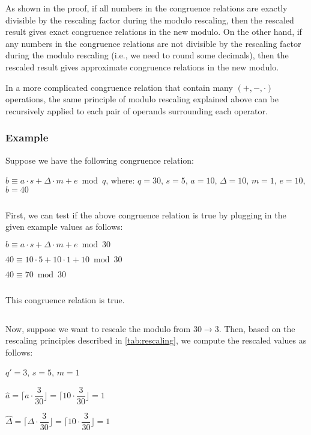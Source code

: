 As shown in the proof, if all numbers in the congruence relations are exactly divisible by the rescaling factor during the modulo rescaling, then the rescaled result gives exact congruence relations in the new modulo. On the other hand, if any numbers in the congruence relations are not divisible by the rescaling factor during the modulo rescaling (i.e., we need to round some decimals), then the rescaled result gives approximate congruence relations in the new modulo.

In a more complicated congruence relation that contain many $(+, -, \cdot)$ operations, the same principle of modulo rescaling explained above can be recursively applied to each pair of operands surrounding each operator. 

\subsubsection{Example}
\label{subsec:modulo-rescaling-ex}

Suppose we have the following congruence relation:

$b \equiv a\cdot s + \Delta \cdot m + e \bmod q$, \text{ } where: $q = 30$, \text{ } $s = 5$, \text{ } $a = 10$, \text{ } $\Delta = 10$, \text{ } $m = 1$, \text{ } $e = 10$, \text{ } $b = 40$

$ $

First, we can test if the above congruence relation is true by plugging in the given example values as follows: 

$b \equiv a\cdot s + \Delta \cdot m + e \bmod 30$

$40 \equiv 10 \cdot 5 + 10 \cdot 1 + 10 \bmod 30$

$40 \equiv 70 \bmod 30$ 

$ $

This congruence relation is true. 

$ $

Now, suppose we want to rescale the modulo from $30 \rightarrow 3$. Then, based on the rescaling principles described in \autoref{tab:rescaling}, we compute the rescaled values as follows: 

$q'= 3$, \text{ } $s = 5$, \text{ } $m = 1$

$\hat{a} = \Bigg\lceil a\cdot\dfrac{3}{30} \Bigg\rfloor = \Bigg\lceil 10\cdot\dfrac{3}{30} \Bigg\rfloor = 1$

$\hat{\Delta} = \Bigg\lceil \Delta\cdot\dfrac{3}{30} \Bigg\rfloor = \Bigg\lceil 10\cdot\dfrac{3}{30} \Bigg\rfloor = 1$



